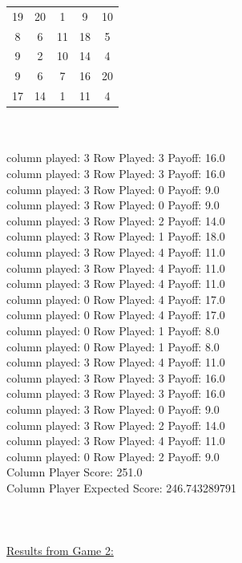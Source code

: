 \documentclass[11pt, oneside]{article}   	%
\begin{document}
\begin{tabular}{ c c c c c}
 19 & 20 &  1 &  9 & 10\\
   8 &  6 & 11 & 18  & 5\\
   9 &  2 & 10 & 14 &  4\\
   9  & 6 &  7 & 16 & 20\\
  17 & 14 &  1 & 11 &  4\\
\end{tabular}
\\
\\
column played: 3   Row Played: 3 Payoff: 16.0\\
column played: 3   Row Played: 3 Payoff: 16.0\\
column played: 3   Row Played: 0 Payoff: 9.0\\
column played: 3   Row Played: 0 Payoff: 9.0\\
column played: 3   Row Played: 2 Payoff: 14.0\\
column played: 3   Row Played: 1 Payoff: 18.0\\
column played: 3   Row Played: 4 Payoff: 11.0\\
column played: 3   Row Played: 4 Payoff: 11.0\\
column played: 3   Row Played: 4 Payoff: 11.0\\
column played: 0   Row Played: 4 Payoff: 17.0\\
column played: 0   Row Played: 4 Payoff: 17.0\\
column played: 0   Row Played: 1 Payoff: 8.0\\
column played: 0   Row Played: 1 Payoff: 8.0\\
column played: 3   Row Played: 4 Payoff: 11.0\\
column played: 3   Row Played: 3 Payoff: 16.0\\
column played: 3   Row Played: 3 Payoff: 16.0\\
column played: 3   Row Played: 0 Payoff: 9.0\\
column played: 3   Row Played: 2 Payoff: 14.0\\
column played: 3   Row Played: 4 Payoff: 11.0\\
column played: 0   Row Played: 2 Payoff: 9.0\\
Column Player Score: 251.0\\
Column Player Expected Score: 246.743289791\\
\\ 
\\
\\
\indent \underline{Results from Game 2:}\\\\
\end{document}
